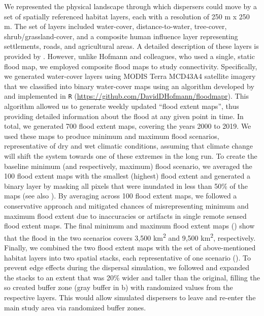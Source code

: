 \documentclass[abstract=on,10pt,a4paper,bibliography=totocnumbered]{article}
\begin{document}
We represented the physical landscape through which dispersers could move by a
set of spatially referenced habitat layers, each with a resolution of 250 m x
250 m. The set of layers included water-cover, distance-to-water, tree-cover,
shrub/grassland-cover, and a composite human influence layer representing
settlements, roads, and agricultural areas. A detailed description of these
layers is provided by \citet{Hofmann.2021}. However, unlike Hofmann and
colleagues, who used a single, static flood map, we employed composite flood
maps to study connectivity. Specifically, we generated water-cover layers using
MODIS Terra MCD43A4 satellite imagery that we classified into binary water-cover
maps using an algorithm developed by \citet{Wolski.2017} and implemented in
\texttt{R} (\url{https://github.com/DavidDHofmann/floodmapr}). This algorithm
allowed us to generate weekly updated ``flood extent maps'', thus providing
detailed information about the flood at any given point in time. In total, we
generated 700 flood extent maps, covering the years 2000 to 2019. We used these
maps to produce minimum and maximum flood scenarios, representative of dry and
wet climatic conditions, assuming that climate change will shift the system
towards one of these extremes in the long run. To create the baseline minimum
(and respectively, maximum) flood scenario, we averaged the 100 flood extent
maps with the smallest (highest) flood extent and generated a binary layer by
masking all pixels that were inundated in less than 50\% of the maps (see also
). By averaging across 100 flood extent maps, we followed a
conservative approach and mitigated chances of misrepresenting minimum and
maximum flood extent due to inaccuracies or artifacts in single remote sensed
flood extent maps. The final minimum and maximum flood extent maps
() show that the flood in the two scenarios covers 3,500
km\textsuperscript{2} and 9,500 km\textsuperscript{2}, respectively. Finally, we
combined the two flood extent maps with the set of above-mentioned habitat
layers into two spatial stacks, each representative of one scenario
(). To prevent edge effects during the dispersal simulation, we
followed \citet{Koen.2010} and expanded the stacks to an extent that was 20\%
wider and taller than the original, filling the so created buffer zone (gray
buffer in b) with randomized values from the respective layers.
This would allow simulated dispersers to leave and re-enter the main study area
via randomized buffer zones.
\end{document}
